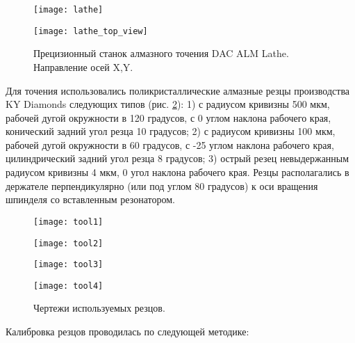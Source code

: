 \begin{figure}[ht]
  \begin{minipage}[ht]{0.49\linewidth}\centering
    \texttt{[image: lathe]}
  \end{minipage}
  \hfill
  \begin{minipage}[ht]{0.49\linewidth}\centering
    \texttt{[image: lathe\_top\_view]}
  \end{minipage}
  \caption{Прецизионный станок алмазного точения DAC ALM Lathe. Направление осей X,Y.}
  \label{lathe}
\end{figure}

Для точения использовались поликристаллические алмазные резцы производства KY Diamonds следующих типов (рис. \ref{diamond_tools}): 1) с радиусом кривизны 500 мкм, рабочей дугой окружности в 120 градусов, с 0 углом наклона рабочего края, конический задний угол резца 10 градусов; 2) с радиусом кривизны 100 мкм, рабочей дугой окружности в 60 градусов, с -25 углом наклона рабочего края, цилиндрический задний угол резца 8 градусов; 3) острый резец невыдержанным радиусом кривизны 4 мкм, 0 угол наклона рабочего края. Резцы располагались в держателе перпендикулярно (или под углом 80 градусов) к оси вращения шпинделя со вставленным резонатором.

\begin{figure}[ht]
  \begin{minipage}[ht]{0.24\linewidth}\centering
    \texttt{[image: tool1]}
  \end{minipage}
  \hfill
  \begin{minipage}[ht]{0.24\linewidth}\centering
    \texttt{[image: tool2]}
  \end{minipage}
  \hfill
  \begin{minipage}[ht]{0.24\linewidth}\centering
    \texttt{[image: tool3]}
  \end{minipage}
  \hfill
  \begin{minipage}[ht]{0.24\linewidth}\centering
    \texttt{[image: tool4]}
  \end{minipage}
  \caption{Чертежи используемых резцов.}
  \label{diamond_tools}
\end{figure}

Калибровка резцов проводилась по следующей методике:

